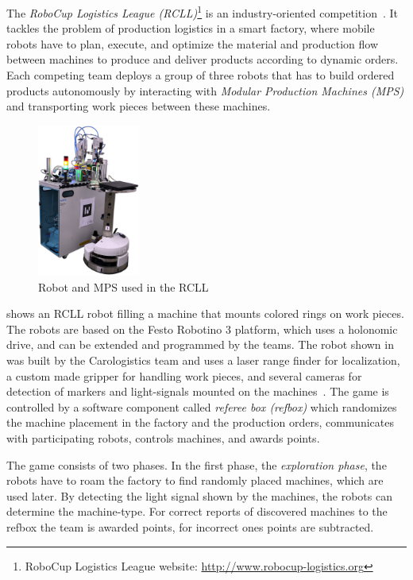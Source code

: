 The \emph{RoboCup Logistics League (RCLL)}\footnote{RoboCup Logistics
  League website: \url{http://www.robocup-logistics.org}} is an
industry-oriented competition~\cite{LLSF-Rules-2016}.
 It tackles the problem of
production logistics in a smart factory, where mobile robots have to
plan, execute, and optimize the material and production flow between
machines to produce and deliver products according to dynamic
orders. Each competing team deploys a group of three robots that has
to build ordered products autonomously by interacting with
\emph{Modular Production Machines (MPS)} and transporting work pieces
between these machines.
\begin{figure}
  \centering
  \vspace{-2.7ex}
  \includegraphics[width=0.3\textwidth]{img/rcll}
  \vspace{-4ex}
  \caption{Robot and MPS used in the RCLL~\cite{chapter-cps}}
  \label{fig:rcll}
\end{figure}
 shows an RCLL robot filling a machine that mounts
colored rings on work pieces. The robots are based on the Festo
Robotino 3 platform, which uses a holonomic drive, and can be extended
and programmed by the teams. The robot shown in  was
built by the Carologistics team and uses a laser range finder for
localization, a custom made gripper for handling work pieces, and
several cameras for detection of markers and light-signals mounted on
the machines~\cite{Carologistics2015,chapter-cps}. The game is
controlled by a software component called \emph{referee box (refbox)}
which randomizes the machine placement in the factory and the
production orders, communicates with participating robots, controls
machines, and awards points.

The game consists of two phases. In the first phase, the
\emph{exploration phase}, the robots have to roam the factory to find
randomly placed machines, which are used later. By detecting the
light signal shown by the machines, the robots can determine the
machine-type. For correct reports of discovered machines to the refbox
the team is awarded points, for incorrect ones points are subtracted.

